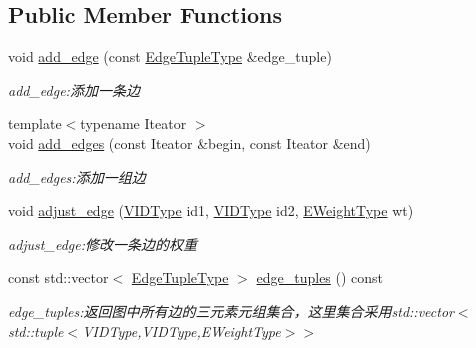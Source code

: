 \subsection*{Public Member Functions}
\begin{DoxyCompactItemize}
\item 
void \hyperlink{struct_introduction_to_algorithm_1_1_graph_algorithm_1_1_a_d_j_list_graph_ab43aa1aae963d7ac931a18c458405c84}{add\+\_\+edge} (const \hyperlink{struct_introduction_to_algorithm_1_1_graph_algorithm_1_1_a_d_j_list_graph_a6757574602df8359b10e37079c789eb6}{Edge\+Tuple\+Type} \&edge\+\_\+tuple)
\begin{DoxyCompactList}\small\item\em add\+\_\+edge\+:添加一条边 \end{DoxyCompactList}\item 
{\footnotesize template$<$typename Iteator $>$ }\\void \hyperlink{struct_introduction_to_algorithm_1_1_graph_algorithm_1_1_a_d_j_list_graph_aeb48c70f535eae9367540bb53ee21c4f}{add\+\_\+edges} (const Iteator \&begin, const Iteator \&end)
\begin{DoxyCompactList}\small\item\em add\+\_\+edges\+:添加一组边 \end{DoxyCompactList}\item 
void \hyperlink{struct_introduction_to_algorithm_1_1_graph_algorithm_1_1_a_d_j_list_graph_a945dcb0463cf00ddf694d107b019b118}{adjust\+\_\+edge} (\hyperlink{struct_introduction_to_algorithm_1_1_graph_algorithm_1_1_a_d_j_list_graph_aa42303d15a6a0e4cf6fad5c1327c1d79}{V\+I\+D\+Type} id1, \hyperlink{struct_introduction_to_algorithm_1_1_graph_algorithm_1_1_a_d_j_list_graph_aa42303d15a6a0e4cf6fad5c1327c1d79}{V\+I\+D\+Type} id2, \hyperlink{struct_introduction_to_algorithm_1_1_graph_algorithm_1_1_a_d_j_list_graph_a8b9518587536b482cfd8c2fc7f5c9678}{E\+Weight\+Type} wt)
\begin{DoxyCompactList}\small\item\em adjust\+\_\+edge\+:修改一条边的权重 \end{DoxyCompactList}\item 
const std\+::vector$<$ \hyperlink{struct_introduction_to_algorithm_1_1_graph_algorithm_1_1_a_d_j_list_graph_a6757574602df8359b10e37079c789eb6}{Edge\+Tuple\+Type} $>$ \hyperlink{struct_introduction_to_algorithm_1_1_graph_algorithm_1_1_a_d_j_list_graph_a32b5e8f3382a8e5508b8e4651ddf245f}{edge\+\_\+tuples} () const 
\begin{DoxyCompactList}\small\item\em edge\+\_\+tuples\+:返回图中所有边的三元素元组集合，这里集合采用{\ttfamily std\+::vector$<$std\+::tuple$<$V\+I\+D\+Type,V\+I\+D\+Type,E\+Weight\+Type$>$$>$} \end{DoxyCompactList}\item 

\end{DoxyCompactItemize}
